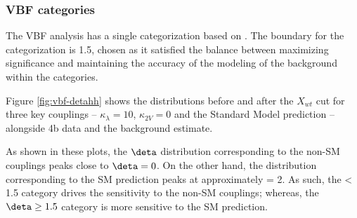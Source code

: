 
\FloatBarrier
\clearpage

\subsubsection{VBF categories}
\label{subsubsec:VBF-cats}

The VBF analysis has a single categorization based on \deta.
The boundary for the categorization is 1.5, chosen as it satisfied the balance between maximizing significance and maintaining the accuracy of the modeling of the background within the categories.

Figure \ref{fig:vbf-detahh} shows the \deta distributions before and after the $X_{wt}$ cut for three key couplings -- $\kappa_{\lambda} = 10$, $\kappa_{2V} = 0$ and the Standard Model prediction -- alongside 4b data and the background estimate.

As shown in these plots, the $\deta$ distribution corresponding to the non-SM couplings peaks close to $\deta = 0$. On the other hand, the distribution corresponding to the SM prediction peaks at approximately \deta = 2. As such, the \deta < 1.5 category drives the sensitivity to the non-SM couplings; whereas, the $\deta \geq 1.5$ category is more sensitive to the SM prediction.

